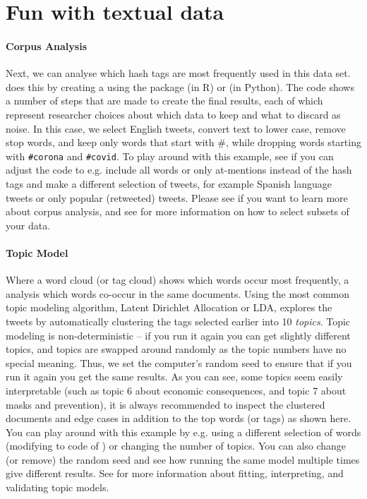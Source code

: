 
\section{Fun with textual data}

\paragraph{Corpus Analysis} Next, we can analyse which hash tags are most frequently used in this data set.
 does this by creating a  using the package  (in R)
or \sklearn (in Python).
The code shows a number of steps that are made to create the final results, each of which represent
researcher choices about which data to keep and what to discard as noise.
In this case,  we select English tweets, convert text to lower case, remove stop words, and keep only words that start with \#,
while dropping words starting with \verb+#corona+ and \verb+#covid+.
To play around with this example,
see if you can adjust the code to e.g. include all words or only at-mentions instead of the hash tags
and make a different selection of tweets, for example Spanish language tweets or only popular (retweeted) tweets.
Please see  if you want to learn more about corpus analysis,
and see  for more information on how to select subsets of your data.


\paragraph{Topic Model}
Where a word cloud (or tag cloud) shows which words occur most frequently,
a  analysis which words co-occur in the same documents.
Using the most common topic modeling algorithm, Latent Dirichlet Allocation or LDA,
 explores the tweets by automatically clustering the tags selected earlier into 10 \emph{topics}.
Topic modeling is non-deterministic -- if you run it again you can get slightly different topics,
and topics are swapped around randomly as the topic numbers have no special meaning.
Thus, we set the computer's random seed to ensure that if you run it again you get the same results.
As you can see, some topics seem easily interpretable (such as topic 6 about economic consequences,
and topic 7 about masks and prevention), it is always recommended to inspect the clustered documents
and edge cases in addition to the top words (or tags) as shown here.
You can play around with this example by e.g. using a different selection of words
(modifying to code of ) or changing the number of topics.
You can also change (or remove) the random seed and see how running the same model multiple times give different results. 
See  for more information about fitting, interpreting, and validating topic models.

